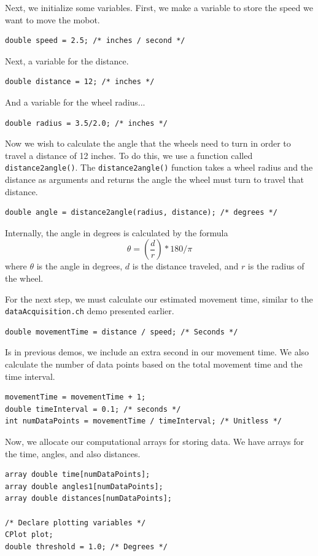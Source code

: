 \documentclass{article}
\begin{document}
Next, we initialize some variables. First, we make a variable to store the speed
we want to move the mobot.
\begin{verbatim}
double speed = 2.5; /* inches / second */
\end{verbatim}

Next, a variable for the distance.
\begin{verbatim}
double distance = 12; /* inches */
\end{verbatim}

And a variable for the wheel radius...
\begin{verbatim}
double radius = 3.5/2.0; /* inches */
\end{verbatim}

Now we wish to calculate the angle that the wheels need to turn in order to
travel a distance of 12 inches. To do this, we use a function called
\texttt{distance2angle()}. The \texttt{distance2angle()} function 
takes a wheel radius and the distance as arguments and returns the angle
the wheel must turn to travel that distance. 
\begin{verbatim}
double angle = distance2angle(radius, distance); /* degrees */
\end{verbatim}

Internally, the angle in degrees is calculated by the formula
\begin{equation*}
\theta  = \left(\frac{d}{r} \right) * 180 / \pi
\end{equation*}
where $\theta$ is the angle in degrees, $d$ is the distance traveled, 
and $r$ is the radius of the wheel.

For the next step, we must calculate our estimated movement time, similar to the
\texttt{dataAcquisition.ch} demo presented earlier. 
\begin{verbatim}
double movementTime = distance / speed; /* Seconds */
\end{verbatim}

Is in previous demos, we include an extra second in our movement time. We
also calculate the number of data points based on the total movement time
and the time interval.
\begin{verbatim}
movementTime = movementTime + 1; 
double timeInterval = 0.1; /* seconds */
int numDataPoints = movementTime / timeInterval; /* Unitless */
\end{verbatim}

Now, we allocate our computational arrays for storing data. We have arrays 
for the time, angles, and also distances.
\begin{verbatim}
array double time[numDataPoints];
array double angles1[numDataPoints];
array double distances[numDataPoints];

/* Declare plotting variables */
CPlot plot;
double threshold = 1.0; /* Degrees */
\end{verbatim}
\end{document}
